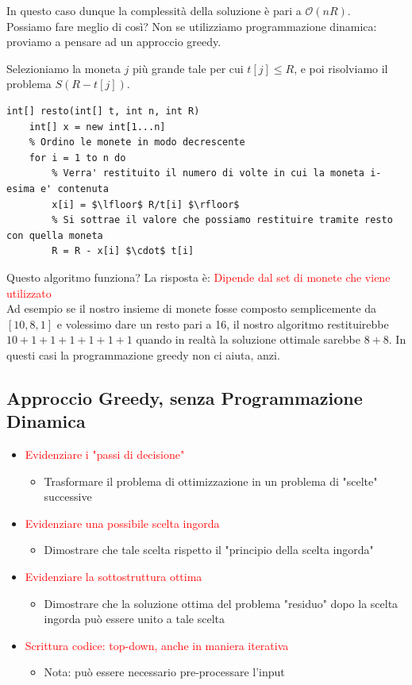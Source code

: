 \documentclass[../cheatSheetAlgoritmi.tex]{subfiles}
\begin{document}
In questo caso dunque la complessità della soluzione è pari a $\mathcal{O}(nR)$.\\
Possiamo fare meglio di così? Non se utilizziamo programmazione dinamica: proviamo a pensare ad un approccio greedy.
\begin{center}
Selezioniamo la moneta $j$ più grande tale per cui $t[j] \leq R$, e poi risolviamo il problema $S(R - t[j])$.
\end{center}
\newpage
\begin{lstlisting}[caption=Resto (Greedy)]
int[] resto(int[] t, int n, int R)
	int[] x = new int[1...n]
	% Ordino le monete in modo decrescente
	for i = 1 to n do
		% Verra' restituito il numero di volte in cui la moneta i-esima e' contenuta
		x[i] = $\lfloor$ R/t[i] $\rfloor$
		% Si sottrae il valore che possiamo restituire tramite resto con quella moneta
		R = R - x[i] $\cdot$ t[i]
\end{lstlisting}
Questo algoritmo funziona? La risposta è: \textcolor{red}{Dipende dal set di monete che viene utilizzato}\\
Ad esempio se il nostro insieme di monete fosse composto semplicemente da $[10, 8, 1]$ e volessimo dare un resto pari a 16, il nostro algoritmo restituirebbe $10 + 1 + 1 + 1+ 1 + 1 + 1$ quando in realtà la soluzione ottimale sarebbe $8 + 8$. In questi casi la programmazione greedy non ci aiuta, anzi.
\subsection{Approccio Greedy, senza Programmazione Dinamica}
\begin{itemize}
	\item \textcolor{red}{Evidenziare i "passi di decisione"}
	\begin{itemize}
		\item Trasformare il problema di ottimizzazione in un problema di
"scelte" successive
	\end{itemize}
	\item \textcolor{red}{Evidenziare una possibile scelta ingorda}
	\begin{itemize}
		\item Dimostrare che tale scelta rispetto il "principio della scelta ingorda"
	\end{itemize}
	\item \textcolor{red}{Evidenziare la sottostruttura ottima}
	\begin{itemize}
		\item Dimostrare che la soluzione ottima del problema "residuo" dopo la
scelta ingorda può essere unito a tale scelta
	\end{itemize}
	\item \textcolor{red}{Scrittura codice: top-down, anche in maniera iterativa}
	\begin{itemize}
		\item Nota: può essere necessario pre-processare l'input
	\end{itemize}
\end{itemize}
\end{document}
